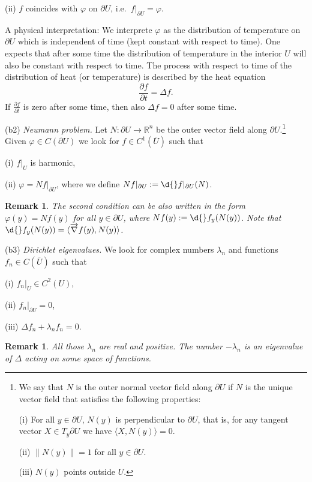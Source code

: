 \documentclass[12pt, oneside, a4paper]{article}
\def\grad{\operatorname{grad}}
\theoremstyle{dfn}
\newtheorem{rem}[thm]{Remark}
\def \grad {\overrightarrow{\nabla}}
\newcommand{\scalprod}[2]{\langle #1,#2 \rangle}
\def\Rbb{\ensuremath{\mathbb{R}}}
\providecommand{\norm}[1]{\lVert#1\rVert}
\begin{document}
(ii) $f$ coincides with $\varphi$ on $\partial U$, i.e.\ $f|_{\partial U} = \varphi$.
\vspace{6pt}

A physical interpretation: We interprete $\varphi$ as the distribution of temperature on $\partial U$ which is independent of time (kept constant with respect to time). One expects that after some time the distribution of temperature in the interior $U$ will also be constant with respect to time. The process with respect to time of the distribution of heat (or temperature) is described by the heat equation
\[
\frac{\partial f}{\partial t} = \Delta f.
\]
If $\frac{\partial f}{\partial t}$ is zero after some time, then also $\Delta f = 0$ after some time.

\vspace{6pt}
\noindent (b2) \emph{Neumann problem.}
Let $N \colon \partial U \to \Rbb^n$ be the outer vector field along $\partial U$.\footnote{We say that $N$ is the outer normal vector field along $\partial U$ if $N$ is the unique vector field that satisfies the following properties:

(i) For all $y \in \partial U$, $N(y)$ is perpendicular to $\partial U$, that is, for any tangent vector $X \in T_y \partial U$ we have $\scalprod{X}{N(y)} = 0$.

(ii) $\norm{N(y)} = 1$ for all $y \in \partial U$.

(iii) $N(y)$ points outside $U$.}
Given $\varphi \in C(\partial U)$ we look for $f \in C^1(\overline{U})$ such that

(i) $f|_U$ is harmonic,

(ii) $\varphi = Nf|_{\partial U}$, where we define $Nf|_{\partial U} := \d{}f|_{\partial U}(N)$.

\begin{rem}
The second condition can be also written in the form $\varphi(y) = Nf(y)$ for all $y \in \partial U$, where $Nf(y) := \d{}f_y(N(y))$. Note that $\d{}f_y(N(y)) = \scalprod{\grad f(y)}{N(y)}$.
\end{rem}

\noindent (b3) \emph{Dirichlet eigenvalues.} We look for complex numbers $\lambda_n$ and functions $f_n \in C(\overline{U})$ such that

(i) $f_n|_U \in C^2(U)$,

(ii) $f_n|_{\partial U} = 0$,

(iii) $\Delta f_n + \lambda_n f_n = 0$.

\begin{rem} All those $\lambda_n$ are real and positive. The number $-\lambda_n$ is an eigenvalue of $\Delta$ acting on some space of functions.
\end{rem}
\end{document}
